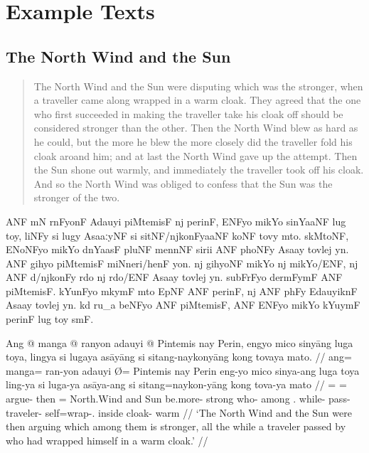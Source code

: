 \chapter{Example Texts}

\section{The North Wind and the Sun}
\label{sec:northwind}
\citep[From][]{becker:northwind}

\blockcquote[After Aesop;][39]{ipa2007}{The North Wind and the Sun were
disputing which was the stronger, when a traveller came along wrapped in a warm
cloak. They agreed that the one who first succeeded in making the traveller
take his cloak off should be considered stronger than the other. Then the North
Wind blew as hard as he could, but the more he blew the more closely did the
traveller fold his cloak aroand him; and at last the North Wind gave up the
attempt. Then the Sun shone out warmly, and immediately the traveller took off
his cloak. And so the North Wind was obliged to confess that the Sun was the
stronger of the two.}

\begin{flushleft}
\noindent\Tagati ANF mN rnFyonF Adauyi piMtemisF nj perinF, ENFyo mikYo
sinYaaNF lug toy, liNFy si lugy AsaaːyNF si sitNF/njkonFyaaNF koNF tovy mto.
skMtoNF, ENoNFyo mikYo dnYaasF pluNF mennNF sirii ANF phoNFy Asaay tovlej yn.
ANF gihyo piM\-temisF miNneri/henF yon. nj gi\-h\-yoNF mikYo nj mikYo/ENF, nj
ANF d/njkonFy rdo nj rdo/ENF Asaay tovlej yn. su\-bFrFyo dermFymF ANF
piMtemisF. kYunFyo mkymF mto EpNF ANF perinF, nj ANF phFy EdauyiknF Asaay
tovlej yn. kd ru\_a beNFyo ANF piMtemisF, ANF ENFyo mikYo kYuymF perinF lug toy
smF.
\end{flushleft}

\medskip

\ex %
\begingl
	\gla Ang @ manga @ ranyon adauyi {} @ Pintemis nay Perin, engyo mico
		sinyāng luga toya, lingya si lugaya asāyāng si sitang-naykonyāng kong
		tovaya mato. //
	\glb ang= manga= ran-yon adauyi Ø= Pintemis nay Perin eng-yo mico sinya-ang
		luga toya ling-ya si luga-ya asāya-ang si sitang=naykon-yāng kong
		tova-ya mato //
	\glc \AgtT{}= \Prog{}= argue-\TplN{} then \Top{}= North.Wind and Sun
		be.more-\TsgN{} strong who-\Aarg{} among \TplN{}.\Loc{}
		while-\Loc{} \Rel{} pass-\TsgM{} traveler-\Aarg{} \Rel{}
		self=wrap-\TsgM{}.\Aarg{} inside cloak-\Loc{} warm //
	\glft `The North Wind and the Sun were then arguing which among them is
		stronger, all the while a traveler passed by who had wrapped himself in
		a warm cloak.' //
\endgl
\xe

